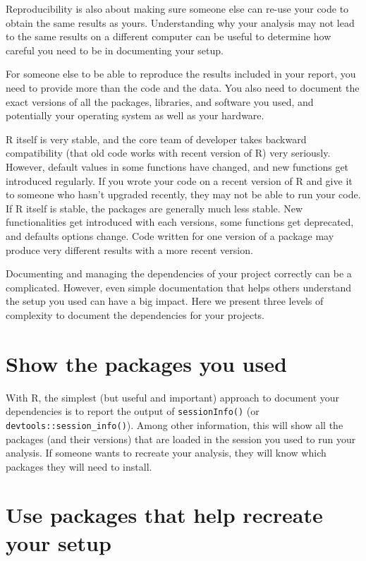 \documentclass[
]{book}
\begin{document}
Reproducibility is also about making sure someone else can re-use your code to obtain the same results as yours. Understanding why your analysis may not lead to the same results on a different computer can be useful to determine how careful you need to be in documenting your setup.

For someone else to be able to reproduce the results included in your report, you need to provide more than the code and the data. You also need to document the exact versions of all the packages, libraries, and software you used, and potentially your operating system as well as your hardware.

R itself is very stable, and the core team of developer takes backward compatibility (that old code works with recent version of R) very seriously. However, default values in some functions have changed, and new functions get introduced regularly. If you wrote your code on a recent version of R and give it to someone who hasn't upgraded recently, they may not be able to run your code. If R itself is stable, the packages are generally much less stable. New functionalities get introduced with each versions, some functions get deprecated, and defaults options change. Code written for one version of a package may produce very different results with a more recent version.

Documenting and managing the dependencies of your project correctly can be a complicated. However, even simple documentation that helps others understand the setup you used can have a big impact. Here we present three levels of complexity to document the dependencies for your projects.

\hypertarget{show-the-packages-you-used}{%
\section{Show the packages you used}\label{show-the-packages-you-used}}

With R, the simplest (but useful and important) approach to document your dependencies is to report the output of \texttt{sessionInfo()} (or \texttt{devtools::session\_info()}). Among other information, this will show all the packages (and their versions) that are loaded in the session you used to run your analysis. If someone wants to recreate your analysis, they will know which packages they will need to install.

\hypertarget{use-packages-that-help-recreate-your-setup}{%
\section{Use packages that help recreate your setup}\label{use-packages-that-help-recreate-your-setup}}
\end{document}
